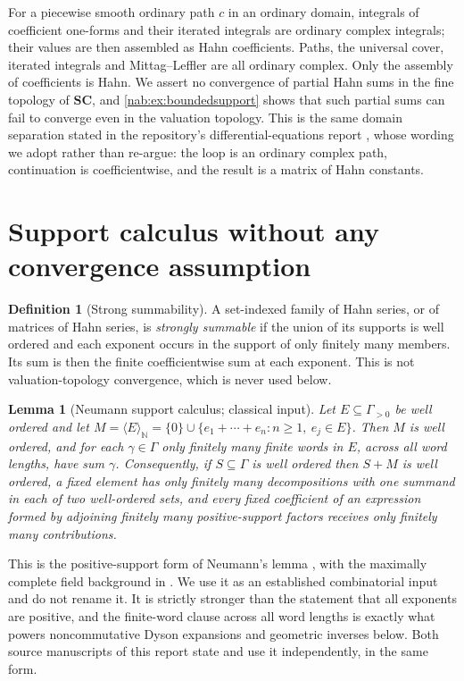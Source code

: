 \documentclass[11pt,letterpaper]{article}
\newtheorem{lemma}[lemma]{Lemma}
\theoremstyle{definition}
\newtheorem{definition}[definition]{Definition}
\theoremstyle{remark}
\newcommand{\N}{\mathbb N}
\newcommand{\SC}{\mathbf{SC}}
\newcommand{\angles}[1]{\langle #1\rangle_{\N}}
\numberwithin{equation}{section}
\begin{document}
For a piecewise smooth ordinary path $c$ in an ordinary domain, integrals of
coefficient one-forms and their iterated integrals are ordinary complex
integrals; their values are then assembled as Hahn coefficients. Paths, the
universal cover, iterated integrals and Mittag--Leffler are all ordinary
complex. Only the assembly of coefficients is Hahn. We assert no convergence
of partial Hahn sums in the fine topology of $\SC$, and
\cref{nab:ex:boundedsupport} shows that such partial sums can fail to converge
even in the valuation topology. This is the same domain separation stated in
the repository's differential-equations report \cite{RepoDiff}, whose wording
we adopt rather than re-argue: the loop is an ordinary complex path,
continuation is coefficientwise, and the result is a matrix of Hahn constants.

\section{Support calculus without any convergence assumption}
\label{nab:sec:support}

\begin{definition}[Strong summability]\label{nab:def:strong}
A set-indexed family of Hahn series, or of matrices of Hahn series, is
\emph{strongly summable} if the union of its supports is well ordered and each
exponent occurs in the support of only finitely many members. Its sum is then
the finite coefficientwise sum at each exponent. This is not
valuation-topology convergence, which is never used below.
\end{definition}

\begin{lemma}[Neumann support calculus; classical input]
\label{nab:lem:neumann}
Let $E\subseteq\Gamma_{>0}$ be well ordered and let
$M=\angles E=\{0\}\cup\{e_1+\cdots+e_n:n\geq1,\ e_j\in E\}$. Then $M$ is well
ordered, and for each $\gamma\in\Gamma$ only finitely many finite words in
$E$, across all word lengths, have sum $\gamma$. Consequently, if
$S\subseteq\Gamma$ is well ordered then $S+M$ is well ordered, a fixed element
has only finitely many decompositions with one summand in each of two
well-ordered sets, and every fixed coefficient of an expression formed by
adjoining finitely many positive-support factors receives only finitely many
contributions.
\end{lemma}

This is the positive-support form of Neumann's lemma
\cite{Neumann}, with the maximally complete field background in
\cite{Poonen}. We use it as an established combinatorial input and do not
rename it. It is strictly stronger than the statement that all exponents are
positive, and the finite-word clause across all word lengths is exactly what
powers noncommutative Dyson expansions and geometric inverses below. Both
source manuscripts of this report state and use it independently, in the same
form.
\end{document}
